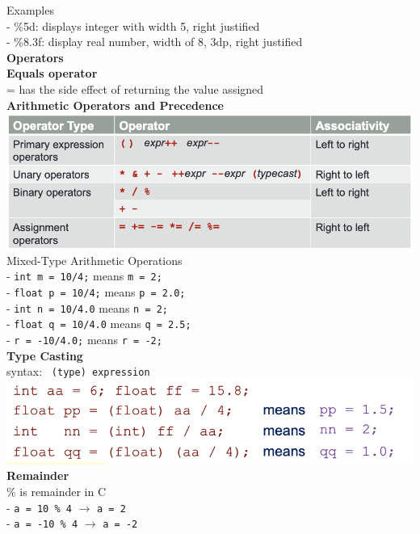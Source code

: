 \documentclass[10pt, a4paper]{article}
\begin{document}
\begin{multicols*}{3}
		Examples\\
		- \%5d: displays integer with width 5, right justified\\
		- \%8.3f: display real number, width of 8, 3dp, right justified\\
		
		\textbf{Operators}\\
		\textbf{Equals operator}\\
		= has the side effect of returning the value assigned\\
		
		\textbf{Arithmetic Operators and Precedence}\\
		\includegraphics[scale= .5]{./assets/arithmeticOperators}\\
		Mixed-Type Arithmetic Operations\\
		- \texttt{int m = 10/4;} means \texttt{m = 2;}\\
		- \texttt{float p = 10/4;} means \texttt{p = 2.0;}\\
		- \texttt{int n = 10/4.0} means \texttt{n = 2;}\\
		- \texttt{float q = 10/4.0} means \texttt{q = 2.5;}\\
		- \texttt{r = -10/4.0;} means \texttt{r = -2;}\\
		
		\textbf{Type Casting}\\
		syntax: \texttt{ (type) expression }\\
		\includegraphics[scale= .5]{./assets/typeCast}\\
		
		\textbf{Remainder}\\
		\% is remainder in C\\
		- \texttt{a = 10 \% 4} $\rightarrow$ \texttt{a = 2}\\
		- \texttt{a = -10 \% 4} $\rightarrow$ \texttt{a = -2}\\
		

\end{multicols*}
\end{document}
